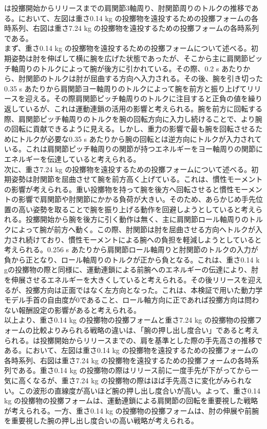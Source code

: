 は投擲開始からリリースまでの肩関節3軸周り、肘関節周りのトルクの推移である。において、左図は重さ0.14 kg の投擲物を遠投するための投擲フォームの各時系列、右図は重さ7.24 kg の投擲物を遠投するための投擲フォームの各時系列である。\\
まず、重さ0.14 kg の投擲物を遠投するための投擲フォームについて述べる。初期姿勢は肘を伸ばして横に腕を広げた状態であったが、そこから主に肩関節ピッチ軸周りのトルクによって腕が後方に引かれている。その際、0.2 s あたりから、肘関節のトルクは肘が屈曲する方向へ入力される。その後、腕を引き切った0.35 s あたりから肩関節ヨー軸周りのトルクによって腕を前方と振り上げてリリースを迎える。その際肩関節ピッチ軸周りのトルクに注目すると正負の値を繰り返しているが、これは運動連鎖の活用の影響と考えられる。腕を前方に回転する際、肩関節ピッチ軸周りのトルクを腕の回転方向に入力し続けることで、より腕の回転に貢献できるように見える。しかし、重力の影響で最も腕を回転させるためにトルクが必要な0.35 s あたりから腕の回転とは逆方向にトルクが入力されている。これは肩関節ピッチ軸周りの関節が持つエネルギーをヨー軸周りの関節にエネルギーを伝達していると考えられる。\\
次に、重さ7.24 kg の投擲物を遠投するための投擲フォームについて述べる。初期姿勢は肘関節を屈曲させて腕を前方高く上げている。これは、慣性モーメントの影響が考えられる。重い投擲物を持って腕を後方へ回転させると慣性モーメントの影響で肩関節や肘関節にかかる負荷が大きい。そのため、あらかじめ手先位置の高い姿勢を取ることで腕を振り上げる動作を回避しようとしていると考えられる。投擲開始から腕を後方に引く動作は無く、主に肩関節ロール軸周りのトルクによって腕が前方へ動く。この際、肘関節は肘を屈曲させる方向へトルクが入力され続けており、慣性モーメントによる腕への負担を軽減しようとしていると考えられる。0.256 s あたりから肩関節ロール軸周りと肘関節のトルクの入力が負から正となり、ロール軸周りのトルクが正から負となる。これは、重さ0.14 k gの投擲物の際と同様に、運動連鎖による前腕へのエネルギーの伝達により、肘を伸展させるエネルギーを大きくしていると考えられる。その後リリースを迎えるが、投擲方向は正面ではなく左方向となった。これは、本検証で用いた動力学モデル手首の自由度が0であること、ロール軸方向に正であれば投擲方向は問わない報酬設定の影響があると考えられる。\\
以上より、重さ0.14 kg の投擲物の投擲フォームと重さ7.24 kg の投擲物の投擲フォームの比較よりみられる戦略の違いは、「腕の押し出し度合い」であると考えられる。は投擲開始からリリースまでの、肩を基準とした際の手先高さの推移である。において、左図は重さ0.14 kg の投擲物を遠投するための投擲フォームの各時系列、右図は重さ7.24 kg の投擲物を遠投するための投擲フォームの各時系列である。重さ0.14 kg の投擲物の際はリリース前に一度手先が下がってから一気に高くなるが、重さ7.24 kg の投擲物の際はほば手先高さに変化がみられない。この波形の直線度が高いほど腕の押し出し度合いが高い。よって、重さ0.14 kg の投擲物の投擲フォームは、運動連鎖による肩関節の回転を重要視した戦略が考えられる。一方、重さ0.14 kg の投擲物の投擲フォームは、肘の伸展や前腕を重要視した腕の押し出し度合いの高い戦略が考えられる。


